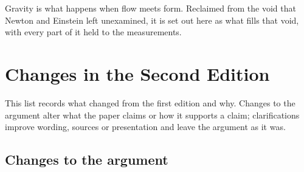 \documentclass[11pt,a4paper]{article}
\begin{document}
Gravity is what happens when flow meets form. Reclaimed from the void that Newton and Einstein left unexamined, it is set out here as what fills that void, with every part of it held to the measurements.

\clearpage
\section*{Changes in the Second Edition}

This list records what changed from the first edition and why. Changes to the argument alter what the paper claims or how it supports a claim; clarifications improve wording, sources or presentation and leave the argument as it was.

\subsection*{Changes to the argument}
\end{document}
